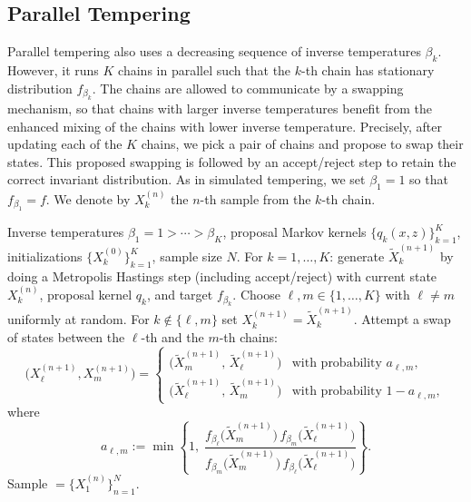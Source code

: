 \subsection{Parallel Tempering}
\label{sec:7.2.2}

Parallel tempering also uses a decreasing sequence of inverse temperatures $\beta_k$. However,
it runs $K$ chains in parallel such that the $k$-th chain has stationary distribution
$f_{\beta_k}$. The chains are allowed to communicate by a swapping mechanism, so that chains
with larger inverse temperatures benefit from the enhanced mixing of the chains with lower
inverse temperature. Precisely, after updating each of the $K$ chains, we pick a pair of
chains and propose to swap their states. This proposed swapping is followed by an accept/reject
step to retain the correct invariant distribution. As in simulated tempering, we set
$\beta_1 = 1$ so that $f_{\beta_1} = f$. We denote by $X_k^{(n)}$ the $n$-th sample from
the $k$-th chain.

\begin{algorithm}[H]
\caption{Parallel Tempering}
\label{alg:7.3}
\begin{algorithmic}[1]
\Require Inverse temperatures $\beta_1 = 1 > \cdots > \beta_K$, proposal Markov kernels
  $\{q_k(x, z)\}_{k=1}^K$, initializations $\{X_k^{(0)}\}_{k=1}^K$, sample size $N$.
  \State For $k = 1, \ldots, K$: generate $\tilde{X}_k^{(n+1)}$ by doing a Metropolis
    Hastings step (including accept/reject) with current state $X_k^{(n)}$, proposal kernel
    $q_k$, and target $f_{\beta_k}$.
  \State Choose $\ell, m \in \{1, \ldots, K\}$ with $\ell \neq m$ uniformly at random.
  \State For $k \notin \{\ell, m\}$ set $X_k^{(n+1)} = \tilde{X}_k^{(n+1)}$.
  \State Attempt a swap of states between the $\ell$-th and the $m$-th chains:
    \[
      \bigl(X_\ell^{(n+1)}, X_m^{(n+1)}\bigr) =
      \begin{cases}
        \bigl(\tilde{X}_m^{(n+1)},\, \tilde{X}_\ell^{(n+1)}\bigr)
          & \text{with probability } a_{\ell,m},\\[4pt]
        \bigl(\tilde{X}_\ell^{(n+1)},\, \tilde{X}_m^{(n+1)}\bigr)
          & \text{with probability } 1 - a_{\ell,m},
      \end{cases}
    \]
    where
    \[
      a_{\ell,m} := \min\!\left\{1,\;
        \frac{f_{\beta_\ell}\!\bigl(\tilde{X}_m^{(n+1)}\bigr)\,
              f_{\beta_m}\!\bigl(\tilde{X}_\ell^{(n+1)}\bigr)}
             {f_{\beta_m}\!\bigl(\tilde{X}_m^{(n+1)}\bigr)\,
              f_{\beta_\ell}\!\bigl(\tilde{X}_\ell^{(n+1)}\bigr)}\right\}.
    \]
\EndFor
\Ensure Sample $= \{X_1^{(n)}\}_{n=1}^N$.
\end{algorithmic}
\end{algorithm}


